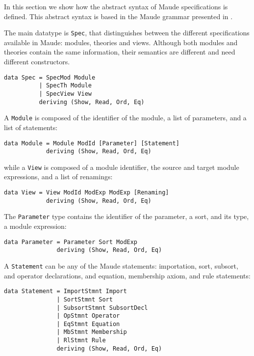 
In this section we show how the abstract syntax of Maude specifications
is defined. This abstract syntax is based in the Maude grammar presented
in \cite[Chapter 24]{maude-book}.

The main datatype is \verb"Spec", that distinguishes between the
different specifications available in Maude: modules, theories and
views. Although both modules and theories contain the same information,
their semantics are different and need different constructors.

{\codesize
\begin{verbatim}
data Spec = SpecMod Module
          | SpecTh Module
          | SpecView View
          deriving (Show, Read, Ord, Eq)
\end{verbatim}
}

A \verb"Module" is composed of the identifier of the module, a list
of parameters, and a list of statements:

{\codesize
\begin{verbatim}
data Module = Module ModId [Parameter] [Statement]
            deriving (Show, Read, Ord, Eq)
\end{verbatim}
}

\noindent while a \verb"View" is composed of a module identifier, the
source and target module expressions, and a list of renamings:

{\codesize
\begin{verbatim}
data View = View ModId ModExp ModExp [Renaming]
            deriving (Show, Read, Ord, Eq)
\end{verbatim}
}

The \verb"Parameter" type contains the identifier of the parameter,
a sort, and its type, a module expression:

{\codesize
\begin{verbatim}
data Parameter = Parameter Sort ModExp
               deriving (Show, Read, Ord, Eq)
\end{verbatim}
}

A \verb"Statement" can be any of the Maude statements:
importation, sort, subsort, and operator declarations, and
equation, membership axiom, and rule statements:

{\codesize
\begin{verbatim}
data Statement = ImportStmnt Import
               | SortStmnt Sort
               | SubsortStmnt SubsortDecl
               | OpStmnt Operator
               | EqStmnt Equation
               | MbStmnt Membership
               | RlStmnt Rule
               deriving (Show, Read, Ord, Eq)
\end{verbatim}
}

